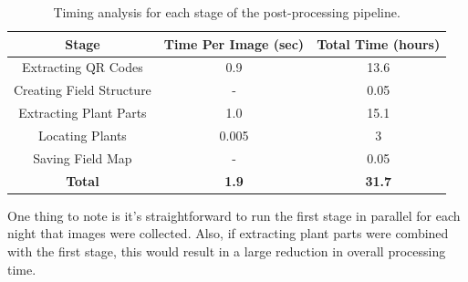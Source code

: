 \begin{table}
    \begin{center}
    \begin{tabular}[c]{|c|c|c|}
        \hline
        Stage & Time Per Image (sec) & Total Time (hours) \\
        \hline
        Extracting QR Codes & 0.9 & 13.6   \\
        Creating Field Structure & - & 0.05   \\
		Extracting Plant Parts & 1.0 & 15.1   \\
		Locating Plants & 0.005 & 3   \\
		Saving Field Map & - & 0.05   \\
		\hline
		\textbf{Total} & \textbf{1.9} & \textbf{31.7}   \\ 
        \hline
    \end{tabular}
    \caption[Post-processing time analysis]{Timing analysis for each stage of the post-processing pipeline.}
    \label{table:timing_analysis}
   \end{center}
\end{table}

One thing to note is it's straightforward to run the first stage in parallel for each night that images were collected.  Also, if extracting plant parts were combined with the first stage, this would result in a large reduction in overall processing time.  

